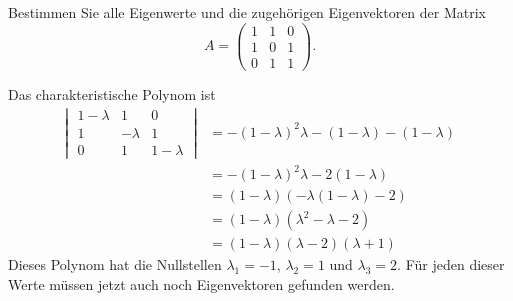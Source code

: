 Bestimmen Sie alle Eigenwerte und die zugehörigen Eigenvektoren der Matrix
\[
A=\begin{pmatrix}
1&1&0\\
1&0&1\\
0&1&1
\end{pmatrix}.
\]

\begin{loesung}
Das charakteristische Polynom ist
\begin{align*}
\left|\;\begin{matrix}
1-\lambda&1&0\\
1&-\lambda&1\\
0&1&1-\lambda
\end{matrix}\;\right|
&=
-(1-\lambda)^2\lambda-(1-\lambda)-(1-\lambda)\\
&=
-(1-\lambda)^2\lambda-2(1-\lambda)\\
&=
(1-\lambda)(-\lambda(1-\lambda)-2)\\
&=
(1-\lambda)(\lambda^2-\lambda-2)\\
&=
(1-\lambda)(\lambda -2 )(\lambda+1)
\end{align*}
Dieses Polynom hat die Nullstellen $\lambda_1=-1$, $\lambda_2=1$
und $\lambda_3=2$. Für jeden dieser Werte müssen jetzt auch noch
Eigenvektoren gefunden werden.


\end{loesung}
